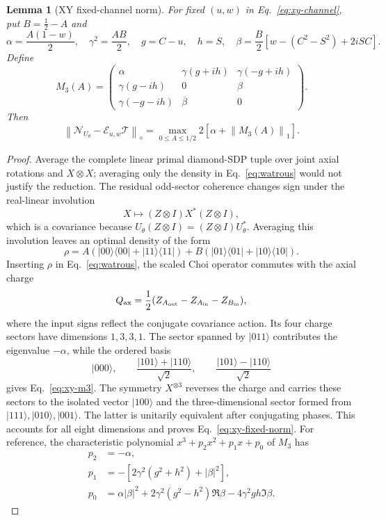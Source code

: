 \documentclass[11pt,a4paper]{article}
\newtheorem{lemma}{Lemma}
\theoremstyle{remark}
\newcommand{\cE}{\mathcal{E}}
\newcommand{\cN}{\mathcal{N}}
\newcommand{\cT}{\mathcal{T}}
\newcommand{\diamondnorm}[1]{\left\lVert #1\right\rVert_{\diamond}}
\newcommand{\tracenorm}[1]{\left\lVert #1\right\rVert_{1}}
\begin{document}
\begin{lemma}[XY fixed-channel norm]
\label{lem:xy-fixed}
For fixed $(u,w)$ in Eq.~\eqref{eq:xy-channel}, put
$B=\frac12-A$ and
\[
 \alpha=\frac{A(1-w)}2,\quad \gamma^2=\frac{AB}{2},\quad
 g=C-u,\quad h=S,\quad
 \beta=\frac{B}{2}\left[w-(C^2-S^2)+2iSC\right].
\]
Define
\begin{equation}
 M_3(A)=
 \begin{pmatrix}
 \alpha&\gamma(g+ih)&\gamma(-g+ih)\\
 \gamma(g-ih)&0&\beta\\
 \gamma(-g-ih)&\overline\beta&0
 \end{pmatrix}.
 \label{eq:xy-m3}
\end{equation}
Then
\begin{equation}
 \diamondnorm{\cN_{U_\theta}-\cE_{u,w}\cT}
 =\max_{0\leq A\leq1/2}
 2\left[\alpha+\tracenorm{M_3(A)}\right].
 \label{eq:xy-fixed-norm}
\end{equation}
\end{lemma}

\begin{proof}
Average the complete linear primal diamond-SDP tuple over joint axial
rotations and $X\otimes X$; averaging only the density in
Eq.~\eqref{eq:watrous} would not justify the reduction.  The residual
odd-sector coherence changes sign under the
real-linear involution
\[
 X\longmapsto(Z\otimes I)X^*(Z\otimes I),
 \]
which is a covariance because
$U_\theta(Z\otimes I)=(Z\otimes I)U_\theta^*$.  Averaging this involution leaves
an optimal density of the form
\[
 \rho=A(|00\rangle\langle00|+|11\rangle\langle11|)
 +B(|01\rangle\langle01|+|10\rangle\langle10|).
\]
Inserting $\rho$ in Eq.~\eqref{eq:watrous}, the scaled Choi operator commutes
with the axial charge
\[
 Q_{\rm ax}=\frac12
 (Z_{A_{\rm out}}-Z_{A_{\rm in}}-Z_{B_{\rm in}}),
\]
where the input signs reflect the conjugate covariance action.  Its four
charge sectors have dimensions $1,3,3,1$.  The sector spanned by
$|011\rangle$ contributes the eigenvalue $-\alpha$, while the ordered basis
\[
 |000\rangle,\qquad
 \frac{|101\rangle+|110\rangle}{\sqrt2},\qquad
 \frac{|101\rangle-|110\rangle}{\sqrt2}
\]
gives Eq.~\eqref{eq:xy-m3}.  The symmetry $X^{\otimes3}$ reverses the charge
and carries these sectors to the isolated vector $|100\rangle$ and the
three-dimensional sector formed from $|111\rangle,|010\rangle,|001\rangle$.
The latter is unitarily equivalent after conjugating phases.  This accounts
for all eight dimensions and proves Eq.~\eqref{eq:xy-fixed-norm}.  For
reference, the characteristic polynomial
$x^3+p_2x^2+p_1x+p_0$ of $M_3$ has
\begin{align*}
 p_2&=-\alpha,\\
 p_1&=-\left[2\gamma^2(g^2+h^2)+|\beta|^2\right],\\
 p_0&=\alpha|\beta|^2
 +2\gamma^2(g^2-h^2)\Re\beta
 -4\gamma^2gh\Im\beta.
\end{align*}
\end{proof}
\end{document}

